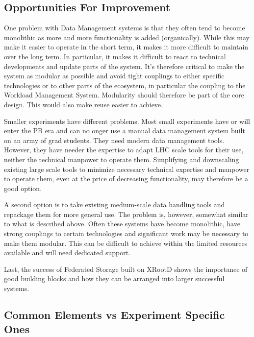\subsection{Opportunities For Improvement}
One problem with Data Management systems is that they often tend to become monolithic as more and more functionality is 
added (organically). While this may make it easier to operate in the short term, it makes it more difficult to maintain over 
the long term. In particular, it makes it difficult to react to technical developments and update parts of the system. It's 
therefore critical to make the system as modular as possible and avoid tight couplings to either specific technologies or 
to other parts of the ecosystem, in particular the coupling to the Workload Management System. Modularity should therefore be 
part of the core design. This would also make reuse easier to achieve. 
\par Smaller experiments have different problems. Most small experiments have or will enter the PB era and can no onger use a manual 
data management system built on an army of grad students. They need modern data management tools. However, they have needer the 
expertise to adapt LHC scale tools for their use, neither the technical manpower to operate them. Simplifying and downscaling existing 
large scale tools to minimize necessary technical expertise and manpower to operate them, even at the price of decreasing functionality, 
may therefore be a good option. 
\par A second option is to take existing medium-scale data handling tools and repackage them for more general use. The problem is, 
however, somewhat similar to what is described above. Often these systems have become monolithic, have strong couplings to certain 
technologies and significant work may be 
necessary to make them modular. This can be difficult to achieve within the limited resources available and will need dedicated support.
\par Last, the success of Federated Storage built on XRootD shows the importance of good building blocks and how they can be arranged into 
larger successful systems.





\subsection{Common Elements vs Experiment Specific Ones}



